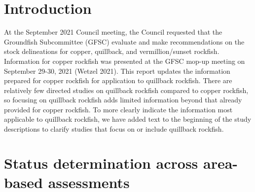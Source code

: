 \documentclass[11pt,
  english,
  letterpaper,
]{article}
\begin{document}
\newcommand{\lt}{\ensuremath <}
\newcommand{\gt}{\ensuremath >}

\pagebreak
{}
\setcounter{page}{1}

\renewcommand{\thetable}{\roman{table}}
\renewcommand{\thefigure}{\roman{figure}}

\setlength\parskip{0.5em plus 0.1em minus 0.2em}

\pagebreak
\setlength{\parskip}{5mm plus1mm minus1mm}
\setcounter{page}{1}
\renewcommand{\thefigure}{\arabic{figure}}
\renewcommand{\thetable}{\arabic{table}}
\setcounter{table}{0}
\setcounter{figure}{0}

\setlength\parskip{0.2em plus 0.1em minus 0.2em}


\hypertarget{introduction}{%
\section{Introduction}\label{introduction}}

\leavevmode\tagmcend\tagstructend


At the September 2021 Council meeting, the Council requested that the Groundfish Subcommittee (GFSC) evaluate and make recommendations on the stock delineations for copper, quillback, and vermillion/sunset rockfish. Information for copper rockfish was presented at the GFSC mop-up meeting on September 29-30, 2021 {(Wetzel 2021)\leavevmode\tagmcend\tagstructend}. This report updates the information prepared for copper rockfish for application to quillback rockfish. There are relatively few directed studies on quillback rockfish compared to copper rockfish, so focusing on quillback rockfish adds limited information beyond that already provided for copper rockfish. To more clearly indicate the information most applicable to quillback rockfish, we have added text to the beginning of the study descriptions to clarify studies that focus on or include quillback rockfish.

\leavevmode\tagmcend\tagstructend\par


\hypertarget{status-determination-across-area-based-assessments}{%
\section{Status determination across area-based assessments}\label{status-determination-across-area-based-assessments}}
\end{document}
